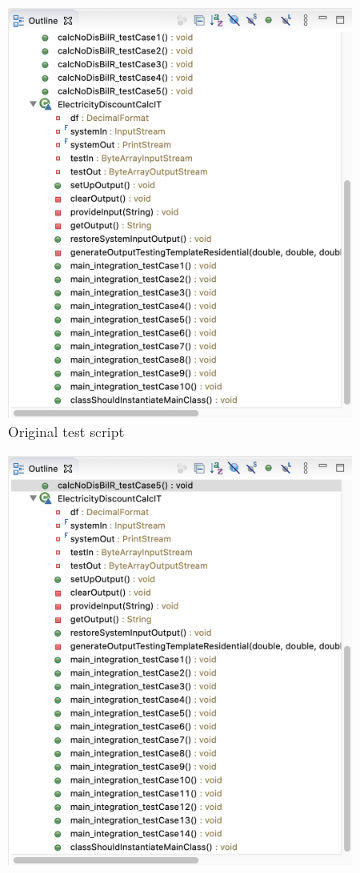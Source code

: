 \documentclass{article}
\begin{document}
    \begin{figure}[h!]
		\centering
		\begin{subfigure}[b]{0.3\linewidth}
			\includegraphics[width=\linewidth]{coverage/opti/10testcases.png}
			\caption{Original test script}
		\end{subfigure}
		\begin{subfigure}[b]{0.3\linewidth}
			\includegraphics[width=\linewidth]{coverage/opti/14testcases.png}

\end{subfigure}
\end{figure}
\end{document}
